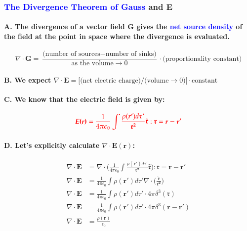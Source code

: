 \documentclass{article}
\begin{document}
\subsubsection{\textcolor{blue}{The Divergence Theorem of Gauss} and $\boldsymbol{E}$}
\paragraph{A. The divergence of a vector field $\boldsymbol{G}$ gives the \textcolor{blue}{net source density} of the field at the point in space where the divergence is evaluated.}
\begin{equation*}
    \nabla\cdot\boldsymbol{G}=\frac{\text{(number of sources}-\text{number of sinks)}}{\text{as the volume}\longrightarrow0}\cdot \text{(proportionality constant)}
\end{equation*}
\paragraph{B. We expect $\nabla\cdot \boldsymbol{E}=\text{[(net electric charge)/(volume}\longrightarrow0)]\cdot \text{constant}$}
\paragraph{C. We know that the electric field is given by:}
\begin{equation*}
    \textcolor{red}{\boldsymbol{E(r)}=\frac{1}{4\pi\epsilon_0}\int \frac{\rho(\boldsymbol{r'})d\tau'}{\boldsymbol{\mathfrak{r}^2}}\hat{\boldsymbol{\mathfrak{r}}}:\boldsymbol{\mathfrak{r}}=\boldsymbol{r-r'}}
\end{equation*}
\paragraph{D. Let's explicitly calculate $\nabla \cdot\boldsymbol{E(r)}$:}
\begin{align*}
    \nabla\cdot\boldsymbol{E}&=\nabla \cdot \bigg( \frac{1}{4\pi\epsilon_0}\int\frac{\rho(\boldsymbol{r'})d\tau'}{\boldsymbol{\mathfrak{r}^2}}\hat{\boldsymbol{\mathfrak{r}}}\bigg):\boldsymbol{\mathfrak{r}}=\boldsymbol{r-r'}\\
    \nabla\cdot\boldsymbol{E}&=\frac{1}{4\pi\epsilon_0}\int\rho(\boldsymbol{r'})d\tau' \nabla \cdot \bigg(\frac{\hat{\boldsymbol{\mathfrak{r}}}}{\boldsymbol{\mathfrak{r}^2}}\bigg)\\
    \nabla\cdot\boldsymbol{E}&=\frac{1}{4\pi\epsilon_0}\int\rho(\boldsymbol{r'})d\tau' \cdot 4\pi\delta^3(\boldsymbol{\mathfrak{r}})\\
    \nabla\cdot\boldsymbol{E}&=\frac{1}{4\pi\epsilon_0}\int\rho(\boldsymbol{r'})d\tau' \cdot 4\pi\delta^3(\boldsymbol{r-r'})\\
    \nabla \cdot\boldsymbol{E}&= \frac{\rho(\boldsymbol{r})}{\epsilon_0}\\
\end{align*}
\end{document}
